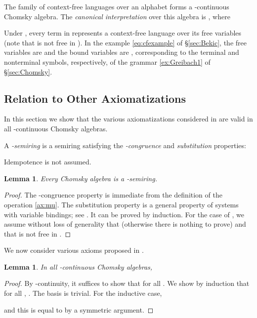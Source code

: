 \documentclass[copyright,creativecommons]{eptcs}
\newtheorem{lemma}[theorem]{Lemma}
\theoremstyle{remark}
\begin{document}
\newcommand\canon[1]{L_{#1}}

The family  of context-free languages over an alphabet  forms a -continuous Chomsky algebra. The \emph{canonical interpretation} over this algebra is , where

Under , every term in  represents a context-free language over its free variables (note that  is not free in ). In the example \eqref{eq:cfexample} of \S\ref{sec:Bekic}, the free variables are  and the bound variables are , corresponding to the terminal and nonterminal symbols, respectively, of the grammar \eqref{ex:Greibach1} of \S\ref{sec:Chomsky}.

\subsection{Relation to Other Axiomatizations}

In this section we show that the various axiomatizations considered in \cite{esle2002,EsikLeiss05,leiss92b} are valid in all -continuous Chomsky algebras.

A \emph{-semiring} \cite{EsikLeiss05} is a semiring  satisfying the \emph{-congruence} and \emph{substitution} properties:

    Idempotence is not assumed.
\begin{lemma}\label{lem:chomskyismusemi}
    Every Chomsky algebra is a -semiring.
\end{lemma}
\begin{proof}
    The -congruence property is immediate from the definition of the  operation \eqref{ax:mu}. 
    The substitution property is a general property of systems with variable bindings; see \cite[Lemma 5.1.5]{Barendregt84}. It can be proved by induction. For the case of , we assume without loss of generality that  (otherwise there is nothing to prove) and that  is not free in .

\end{proof}

We now consider various axioms proposed in \cite{leiss92b}.

\begin{lemma}\label{lem:samelists}
In all -continuous Chomsky algebras,

\end{lemma}
\begin{proof}
By -continuity, it suffices to show that  for all
. We show by induction that for all , .
The basis  is trivial. For the inductive case,

and this is equal to  by a symmetric argument.
\end{proof}
\end{document}
